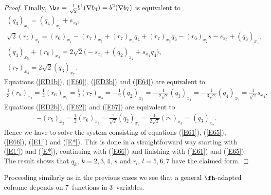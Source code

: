 \begin{proof}
Finally, $\bv=\frac1{\sqrt2} b^1(\nabla b_4)=b^2(\nabla b_7)$ is equivalent to
\begin{gather}
 (q_3)_{x_4}=(q_4)_{x_7}+s_{x_4}, \label{E64}\\
 \sqrt2(r_5)_{x_4}=(r_6)_{x_7} -(r_7)_{x_6}+(r_7)_{x_4}q_4+(r_7)_{x_3}q_3-(r_6)_{x_2}s - s_{x_5}+(q_3)_{x_5},\label{E65}\\
 (q_4)_{x_5}+(r_6)_{x_4} = 2\sqrt2 \big({-}s_{x_6}+ (q_2)_{x_7} +s_{x_4}q_4\big), \label{E66} \\
 (r_7)_{x_4} = 2\sqrt2 (q_3)_{x_7} . \label{E67}
\end{gather}
Equations (\ref{ED1b}), (\ref{E60}), (\ref{ED3b}) and (\ref{E64}) are equivalent to
\begin{gather}\label{E1'}
\tfrac13 (r_5)_{x_1} = \tfrac14 (r_6)_{x_2}=\tfrac12 (r_7)_{x_3} =-\tfrac12 (q_2)_{x_3}=-\tfrac 1{2\sqrt 2} (q_3)_{x_4}=-\tfrac1{3\sqrt2} (q_4)_{x_7}=\tfrac 1{\sqrt2} s_{x_4}.
\end{gather}
Equations (\ref{ED2b}), (\ref{E62}) and (\ref{E67}) are equivalent to
\begin{gather}\label{E*}
-(r_5)_{x_2}=\tfrac12 (r_6)_{x_3}=\tfrac1{\sqrt 2}(q_2)_{x_4}=\tfrac1 {2\sqrt2}(r_7)_{x_4} =(q_3)_{x_7} .
\end{gather}
Hence we have to solve the system consisting of equations (\ref{E61}), (\ref{E65}), (\ref{E66}), (\ref{E1'}) and (\ref{E*}). This is done in a straightforward way starting with (\ref{E1'}) and (\ref{E*}), continuing with (\ref{E66}) and finishing with (\ref{E61}) and (\ref{E65}).
The result shows that $q_k$, $k=2,3,4$, $s$ and $r_l$, $l=5,6,7$ have the claimed form. \end{proof}

\begin{Remark} Proceeding similarly as in the previous cases we see that a general $\fh$-adapted coframe depends on 7~functions in 3~variables.
\end{Remark}

